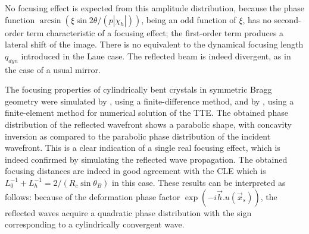 \documentclass[preprint]{iucr}              %
\begin{document}
No focusing effect is expected from this amplitude distribution, because the phase function $\arcsin(\xi \sin2\theta/ (p |\chi_h|))$, being an odd function of $\xi$, has no second-order term characteristic of a focusing effect; the first-order term produces a lateral shift of the image. There is no equivalent to the dynamical focusing length $q_{dyn}$ introduced in the Laue case. The reflected beam is indeed divergent, as in the case of a usual mirror.

The focusing properties of cylindrically bent crystals in symmetric Bragg geometry were simulated by \cite{sutter2010}, using a finite-difference method, and by \cite{honkanen2017, Honkanen2018}, using a finite-element method for numerical solution of the TTE. The obtained phase distribution of the reflected wavefront shows a parabolic shape, with concavity inversion as compared to the parabolic phase distribution of the incident wavefront. This is a clear indication of a single real focusing effect, which is indeed confirmed by simulating the reflected wave propagation. The obtained focusing distances are indeed in good agreement with the CLE which is $L_0^{-1}+L_h^{-1}=2/(R_c \sin\theta_B)$ in this case.
These results can be interpreted as follows: because of the deformation phase factor $\exp(-i\vec h. u(\vec x_s))$, the reflected waves acquire a quadratic phase distribution with the sign corresponding to a cylindrically convergent wave.
\end{document}
